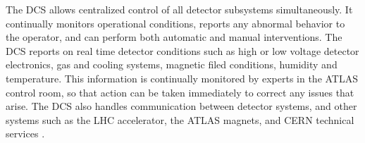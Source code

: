 	The DCS allows centralized control of all detector subsystems simultaneously. It continually monitors operational conditions, reports any abnormal behavior to the operator, and can perform both automatic and manual interventions. The DCS reports on real time detector conditions such as high or low voltage detector electronics, gas and cooling systems, magnetic filed conditions, humidity and temperature. This information is continually monitored by experts in the ATLAS control room, so that action can be taken immediately to correct any issues that arise. The DCS also handles communication between detector systems, and other systems such as the LHC accelerator, the ATLAS magnets, and CERN technical services \cite{atlas_overview}. 


